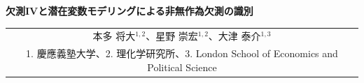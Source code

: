 \documentclass[a4paper,10pt]{article}
\newcommand{\papertitle}{欠測IVと潜在変数モデリングによる非無作為欠測の識別}
\newcommand{\authorblock}{%
  \begin{tabular}{c}
    本多 将大\(^{1,2}\)、星野 崇宏\(^{1,2}\)、大津 泰介\(^{1,3}\)\\[-0.1mm]
    {\scriptsize 1. 慶應義塾大学、2. 理化学研究所、3. London School of Economics and Political Science}
  \end{tabular}
}
\begin{document}
\begin{center}
  {\LARGE\bfseries \papertitle\par}
  \vspace{2mm}
  {\normalsize \authorblock}
\end{center}
\vspace{3mm}

\begin{abstract}
多次元の測定項目がmissing not at random (MNAR)で欠測するとき，観測変数の
full-data lawを回復するだけでは，その背後にある潜在クラス比率と測定核は一般に
分離されない。本稿は，第一段階でshadow instrumental variableとblockwise
complete-case completenessを用いて各supported-block lawを回復し，第二段階で
overlapping block lawsをanchor itemsとlatent shifterにより接続する。有限潜在クラス
モデルについて，Kruskal型rank条件の下で潜在クラス比率と全測定核を共通labelの
下で識別し，global complete caseを必要としないbridge-weighted composite estimatorを
構成する。有限次元bridgeに対する一致性と漸近正規性を示す。
数値実験では，従来のblockwise bridge実験と，追加制約を課した観測カテゴリモデルの
同時尤度による実験を区別する。後者では$n=1{,}000$のMCAR・MAR・MNARを比較し，
MNARにおけるbias補正と，境界解によるWald推論の限界を検討する。

\noindent\textbf{Keywords:} MNAR; shadow variable; completeness; latent class;
tensor decomposition; instrumental variable
\end{abstract}
\end{document}
